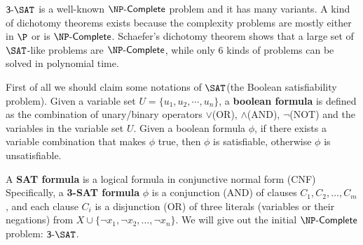 
$\sat{3}$ is a well-known $\complete{\NP}$ problem and it has many variants. A kind of dichotomy theorems exists because the complexity problems are mostly either in $\P$ or is $\complete{\NP}$. Schaefer's dichotomy theorem shows that a large set of $\SAT$-like problems are $\complete{\NP}$, while only $6$ kinds of problems can be solved in polynomial time.

First of all we should claim some notations of $\SAT$(the Boolean satisfiability problem). Given a variable set $U = \{u_1,u_2,\cdots,u_n\}$, a \textbf{boolean formula} is defined as the combination of unary/binary operators $\vee$(OR), $\wedge$(AND), $\neg$(NOT) and the variables in the variable set $U$. Given a boolean formula $\phi$, if there exists a variable combination that makes $\phi$ true, then $\phi$ is satisfiable, otherwise $\phi$ is unsatisfiable.

A \textbf{SAT formula} is a logical formula in conjunctive normal form (CNF) Specifically, a \textbf{3-SAT formula} $\phi$ is a conjunction (AND) of clauses $C_1, C_2, \ldots, C_m$, and each clause $C_i$ is a disjunction (OR) of three literals (variables or their negations) from $X \cup \{\neg x_1, \neg x_2, \ldots, \neg x_n\}$. We will give out the initial $\complete{\NP}$ problem: $\sat{3}$.

